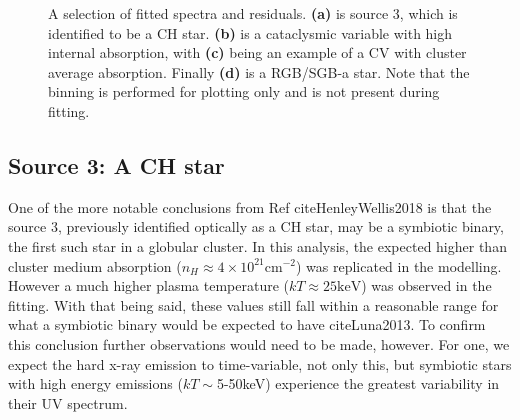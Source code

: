 \documentclass[aps,
                pra,  
                a4paper, 
                amsmath, 
                amssymb, 
                preprint,
                tightenlines,  
                amsfonts,
                nofootinbib,
                notitlepage
            ]{revtex4-2}
\begin{document}
\begin{figure}[H]
    \caption{A selection of fitted spectra and residuals. {\bf (a)} is source 3, which is identified to be a CH star. {\bf (b)} is a cataclysmic variable with high internal absorption, with {\bf (c)} being an example of a CV with cluster average absorption. Finally {\bf (d)} is a RGB/SGB-a star. Note that the binning is performed for plotting only and is not present during fitting.}
    \label{fig:main-4-spectra}
\end{figure}

\subsection{Source 3: A CH star}
One of the more notable conclusions from Ref cite{HenleyWellis2018} is that the source 3, previously identified optically as a CH star, may be a symbiotic binary, the first such star in a globular cluster. In this analysis, the expected higher than cluster medium absorption ($n_H\approx4\times10^{21}\text{cm}^{-2}$) was replicated in the modelling. However a much higher plasma temperature ($kT\approx25\text{keV}$) was observed in the fitting. With that being said, these values still fall within a reasonable range for what a symbiotic binary would be expected to have cite{Luna2013}. To confirm this conclusion further observations would need to be made, however. For one, we expect the hard x-ray emission to time-variable, not only this, but symbiotic stars with high energy emissions ($kT\sim$5-50keV) experience the greatest variability in their UV spectrum. 
\end{document}
